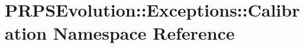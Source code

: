 \hypertarget{namespace_p_r_p_s_evolution_1_1_exceptions_1_1_calibration}{\section{\-P\-R\-P\-S\-Evolution\-:\-:\-Exceptions\-:\-:\-Calibration \-Namespace \-Reference}
\label{namespace_p_r_p_s_evolution_1_1_exceptions_1_1_calibration}
}
